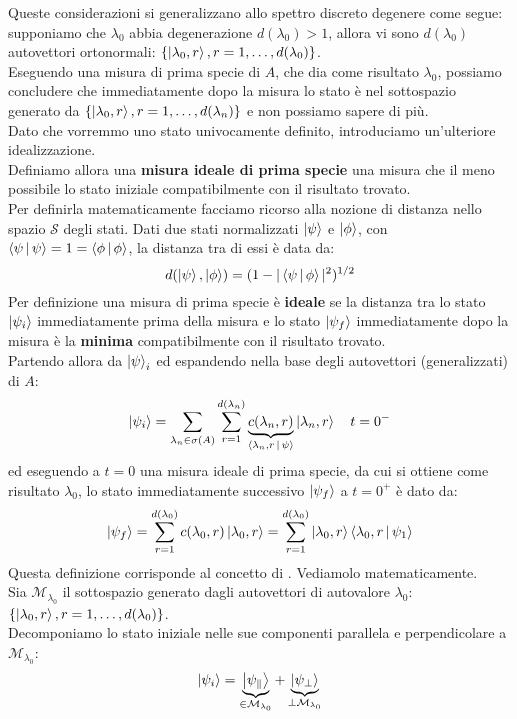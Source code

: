 \documentclass[../../FisicaTeorica.tex]{subfiles}
\begin{document}
Queste considerazioni si generalizzano allo spettro discreto degenere come segue: supponiamo che $\lambda_0$ abbia degenerazione $d(\lambda_0)>1$, allora vi sono $d(\lambda_0)$ autovettori ortonormali: $\{\Ket{\lambda_0,r}, r=1,\dots, d(\lambda_0)\}$.\\
Eseguendo una misura di prima specie di $A$, che dia come risultato $\lambda_0$, possiamo concludere che immediatamente dopo la misura lo stato è nel sottospazio generato da $\{\Ket{\lambda_0,r}, r=1,\dots, d(\lambda_n)\}$ e non possiamo sapere di più.\\
Dato che vorremmo uno stato univocamente definito, introduciamo un'ulteriore idealizzazione.\\
Definiamo allora una \textbf{misura ideale di prima specie} una misura che  il meno possibile lo stato iniziale compatibilmente con il risultato trovato.\\
Per definirla matematicamente facciamo ricorso alla nozione di distanza nello spazio $\mathcal{S}$ degli stati. Dati due stati normalizzati $\Ket{\psi}$ e $\Ket{\phi}$, con $\Braket{\psi|\psi}=1=\Braket{\phi|\phi}$, la distanza tra di essi è data da:
\[
d(\Ket{\psi},\Ket{\phi}) = (1-|\Braket{\psi|\phi}|^2)^{1/2}
\]
Per definizione una misura di prima specie è \textbf{ideale} se la distanza tra lo stato $\Ket{\psi_i}$ immediatamente prima della misura e lo stato $\Ket{\psi_f}$ immediatamente dopo la misura è la \textbf{minima} compatibilmente con il risultato trovato.\\
Partendo allora da $\Ket{\psi}_i$ ed espandendo nella base degli autovettori (generalizzati) di $A$:
\[
\Ket{\psi_i}=\sum_{\lambda_n \in \sigma(A)}\sum_{r=1}^{d(\lambda_n)} \underbrace{c(\lambda_n,r)}_{\Braket{\lambda_n,r|\psi}}\Ket{\lambda_n,r}\quad t=0^-
\]
ed eseguendo a $t=0$ una misura ideale di prima specie, da cui si ottiene come risultato $\lambda_0$, lo stato immediatamente successivo $\Ket{\psi_f}$ a $t=0^+$ è dato da:
\[
\Ket{\psi_f} = \sum_{r=1}^{d(\lambda_0)} c(\lambda_0,r)\Ket{\lambda_0, r} = \sum_{r=1}^{d(\lambda_0)}\Ket{\lambda_0,r}\Braket{\lambda_0,r|\psi_1}
\]
Questa definizione corrisponde al concetto di . Vediamolo matematicamente.\\
Sia $\mathcal{M}_{\lambda_0}$ il sottospazio generato dagli autovettori  di autovalore $\lambda_0$: $\{\Ket{\lambda_0,r}, r=1,\dots, d(\lambda_0)\}$.\\
Decomponiamo lo stato iniziale nelle sue componenti parallela e perpendicolare a $\mathcal{M}_{\lambda_0}$:
\begin{equation}
\Ket{\psi_i} = \underbrace{\Ket{\psi_\parallel}}_{\in \mathcal{M}_{\lambda_0}} + \underbrace{\Ket{\psi_\perp}}_{\perp \mathcal{M}_{\lambda_0}}
\label{eqn:decomposizione}
\end{equation}
\end{document}
